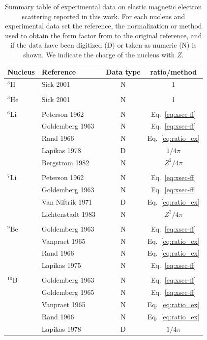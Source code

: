 \documentclass[aps,prc,floatfix,showpacs,twocolumn, preprintnumbers]{revtex4-2}
\begin{document}
\begin{table}
\begin{center}
\begin{tabular}{llcc}
  \hline
  \hline
Nucleus & Reference & Data type & ratio/method \\   
  \hline
   ${}^3$H & Sick 2001~\cite{Sick2001} & N & 1 \\
   & & & \\
  ${}^3$He & Sick 2001~\cite{Sick2001} & N & 1 \\
   & & & \\
  ${}^6$Li & Peterson 1962~\cite{Peterson1962} & N & Eq.~\eqref{eq:xsec-ff} \\
           & Goldemberg 1963~\cite{Goldemberg1963} & N & Eq.~\eqref{eq:xsec-ff} \\
           & Rand 1966~\cite{Rand1966} & N & Eq.~\eqref{eq:ratio_ex}\\
           & Lapikas 1978~\cite{Lapikas1978} & D & $1/4\pi$ \\
           & Bergstrom 1982~\cite{Bergstrom1982} & N & $Z^2/4\pi$\\
            & & & \\
    ${}^7$Li & Peterson 1962~\cite{Peterson1962} & N & Eq.~\eqref{eq:xsec-ff} \\
    & Goldemberg 1963~\cite{Goldemberg1963} & N & Eq.~\eqref{eq:xsec-ff} \\
    &Van Niftrik 1971~\cite{Vanniftrik1971} & D & Eq.~\eqref{eq:ratio_ex}\\
    &Lichtenstadt 1983~\cite{Lichtenstadt1983} & N & $Z^2/4\pi$\\
     & & & \\
    ${}^9$Be & Goldemberg 1963~\cite{Goldemberg1963} & N & Eq.~\eqref{eq:xsec-ff}\\
    & Vanpraet 1965~\cite{Vanpraet1965} & N & Eq.~\eqref{eq:ratio_ex} \\
    & Rand 1966~\cite{Rand1966} & N & Eq.~\eqref{eq:ratio_ex}\\
    & Lapikas 1975~\cite{Lapikas1975} & N& Eq.~\eqref{eq:xsec-ff} \\
     & & & \\
     ${}^{10}$B & Goldemberg 1963~\cite{Goldemberg1963} & N & Eq.~\eqref{eq:xsec-ff} \\
     & Goldemberg 1965~\cite{Goldemberg1965} & N & Eq.~\eqref{eq:xsec-ff}\\
     &Vanpraet 1965~\cite{Vanpraet1965} & N  & Eq.~\eqref{eq:ratio_ex}\\
     & Rand 1966~\cite{Rand1966} & N & Eq.~\eqref{eq:ratio_ex}\\
     & Lapikas 1978~\cite{Lapikas1978} & D & $1/4\pi$ \\
  \hline
  \hline
\end{tabular}
\end{center}
\caption{\label{tab:data}
  Summary table of experimental data on elastic magnetic electron scattering reported in this work.  For each nucleus and experimental data set  the reference, the normalization or method used to obtain the form factor from to the original reference, and if the data have been digitized (D) or taken as numeric (N) is shown. We indicate the charge of the nucleus with $Z$. }
\end{table}



\end{document}
